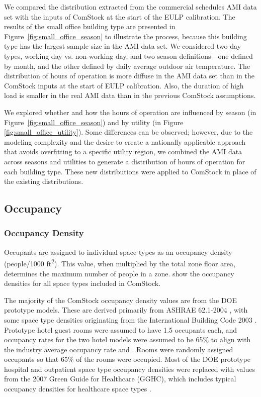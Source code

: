 We compared the distribution extracted from the commercial schedules AMI data set with the inputs of ComStock at the start of the EULP calibration. The results of the small office building type are presented in Figure~\ref{fig:small_office_season} to illustrate the process, because this building type has the largest sample size in the AMI data set. We considered two day types, working day vs. non-working day, and two season definitions---one defined by month, and the other defined by daily average outdoor air temperature. The distribution of hours of operation is more diffuse in the AMI data set than in the ComStock inputs at the start of EULP calibration. Also, the duration of high load is smaller in the real AMI data than in the previous ComStock assumptions.

We explored whether and how the hours of operation are influenced by season (in Figure~\ref{fig:small_office_season}) and by utility (in Figure \ref{fig:small_office_utility}). Some differences can be observed; however, due to the modeling complexity and the desire to create a nationally applicable approach that avoids overfitting to a specific utility region, we combined the AMI data across seasons and utilities to generate a distribution of hours of operation for each building type. These new distributions were applied to ComStock in place of the existing distributions.


\subsection{Occupancy}
\subsubsection{Occupancy Density}
Occupants are assigned to individual space types as an occupancy density (people/1000 ft\textsuperscript{2}). This value, when multiplied by the total zone floor area, determines the maximum number of people in a zone.   show the occupancy densities for all space types included in ComStock.

The majority of the ComStock occupancy density values are from the DOE prototype models. These are derived primarily from ASHRAE 62.1-2004 \citep{ashrae_62.1_2004}, with some space type densities originating from the International Building Code 2003 \citep{icc_2003}. Prototype hotel guest rooms were assumed to have 1.5 occupants each, and occupancy rates for the two hotel models were assumed to be 65\% to align with the industry average occupancy rate and \cite{jiang_2008}. Rooms were randomly assigned occupants so that 65\% of the rooms were occupied. Most of the DOE prototype hospital and outpatient space type occupancy densities were replaced with values from the 2007 Green Guide for Healthcare (GGHC), which includes typical occupancy densities for healthcare space types \citep{gghc_2007}.

